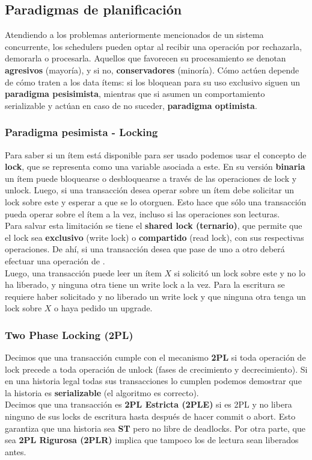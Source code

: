 \subsection*{Paradigmas de planificación}
Atendiendo a los problemas anteriormente mencionados de un sistema concurrente, los schedulers pueden optar al recibir una operación por rechazarla, demorarla o procesarla. Aquellos que favorecen su procesamiento se denotan
 \textbf{agresivos} (mayoría), y si no, \textbf{conservadores} (minoría). Cómo actúen depende de cómo traten a los data ítems: si los bloquean para su uso exclusivo siguen un \textbf{paradigma pesisimista}, mientras que si asumen un comportamiento serializable y actúan en caso de no suceder, \textbf{paradigma optimista}.

\subsubsection*{Paradigma pesimista - Locking}
Para saber si un ítem está disponible para ser usado podemos usar el concepto de \textbf{lock}, que se representa como una variable asociada a este. En su versión \textbf{binaria} un ítem puede bloquearse o desbloquearse a través de las operaciones de lock y unlock. Luego, si una transacción desea operar sobre un ítem debe solicitar un lock sobre este y esperar a que se lo otorguen. Esto hace que sólo una transacción pueda operar sobre el ítem a la vez, incluso si las operaciones son lecturas. \\
Para salvar esta limitación se tiene el \textbf{shared lock (ternario)}, que permite que el lock sea \textbf{exclusivo} (write lock) o \textbf{compartido} (read lock), con sus respectivas operaciones. De ahí, si una transacción desea que pase de uno a otro deberá efectuar una operación de . \\
Luego, una transacción puede leer un ítem $X$ si solicitó un lock sobre este y no lo ha liberado, y ninguna otra tiene un write lock a la vez. Para la escritura se requiere haber solicitado y no liberado un write lock y que ninguna otra tenga un lock sobre $X$ o haya pedido un upgrade.

\subsubsection*{Two Phase Locking (2PL)}
Decimos que una transacción cumple con el mecanismo \textbf{2PL} si toda operación de lock precede a toda operación de unlock (fases de crecimiento y decrecimiento). Si en una historia legal todas sus transacciones lo cumplen podemos demostrar que la historia es \textbf{serializable} (el algoritmo es correcto). \\
Decimos que una transacción es \textbf{2PL Estricta (2PLE)} si es 2PL y no libera ninguno de sus locks de escritura hasta después de hacer commit o abort. Esto garantiza que una historia sea \textbf{ST} pero no libre de deadlocks. Por otra parte, que sea \textbf{2PL Rigurosa (2PLR)} implica que tampoco los de lectura sean liberados antes.

